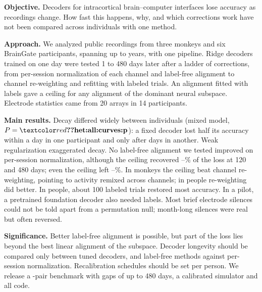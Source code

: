 \noindent\textbf{Objective.} Decoders for intracortical brain--computer interfaces lose accuracy as recordings change.
How fast this happens, why, and which corrections work have not been compared across individuals with one method.

\noindent\textbf{Approach.} We analyzed public recordings from three monkeys and six BrainGate participants, spanning
up to  years, with one pipeline. Ridge decoders trained on one day were tested 1 to 480 days later
after a ladder of corrections, from per-session normalization of each channel and label-free alignment to channel
re-weighting and refitting with labeled trials. An alignment fitted with labels gave a ceiling for any alignment of
the dominant neural subspace. Electrode statistics came from 20 arrays in 14 participants.

\noindent\textbf{Main results.} Decay differed widely between individuals (mixed model, $P = \val{het:all:curves:p}$):
a fixed decoder lost half its accuracy within a day in one participant and only after  days in
another. Weak regularization exaggerated decay. No label-free alignment we tested improved on per-session
normalization, although the ceiling recovered --\% of the loss at 120 and
480 days; even the ceiling left --\%. In monkeys the ceiling beat channel re-weighting,
pointing to activity remixed across channels; in people re-weighting did better. In people, about 100 labeled trials
restored most accuracy. In a pilot, a pretrained foundation decoder also needed labels. Most brief electrode silences could not be told
apart from a permutation null; month-long silences were real but often reversed.

\noindent\textbf{Significance.} Better label-free alignment is possible, but part of the loss lies beyond the best
linear alignment of the subspace. Decoder longevity should be compared only between tuned decoders, and label-free
methods against per-session normalization. Recalibration schedules should be set per person. We release a
-pair benchmark with gaps of up to 480 days, a calibrated simulator and all code.
